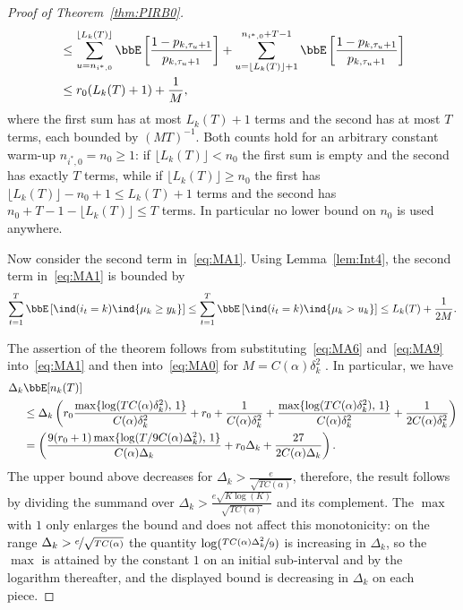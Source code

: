 \documentclass[11pt]{article}
\begin{document}
\begin{proof}[Proof of Theorem~\ref{thm:PIRB0}]
\begin{align}
    \nonumber
    &\leq \sum_{u=n_{i^*,0}}^{\lfloor L_k(T) \rfloor} \bbE \left[   \frac{1-p_{k,\tau_{u}+1}}{p_{k,\tau_{u}+1}}     \right]   + \sum_{u=\lfloor L_k(T) \rfloor + 1}^{n_{i^*,0}+T-1} \bbE \left[   \frac{1-p_{k,\tau_{u}+1}}{p_{k,\tau_{u}+1}}     \right]
    \\
    &\leq  r_0(L_k(T)+1) + \frac{1}{M},
    \label{eq:MA6} 
   \end{align}
   where the first sum has at most $L_k(T)+1$ terms and the second has at most $T$ terms, each bounded by $(MT)^{-1}$. Both counts hold for an arbitrary constant warm-up $n_{i^*,0}=n_0\geq1$: if $\lfloor L_k(T)\rfloor < n_0$ the first sum is empty and the second has exactly $T$ terms, while if $\lfloor L_k(T)\rfloor \geq n_0$ the first has $\lfloor L_k(T)\rfloor-n_0+1 \leq L_k(T)+1$ terms and the second has $n_0+T-1-\lfloor L_k(T)\rfloor \leq T$ terms. In particular no lower bound on $n_0$ is used anywhere. 

Now consider the second term in~\eqref{eq:MA1}. Using Lemma~\ref{lem:Int4}, the second term in~\eqref{eq:MA1} is bounded by
\begin{align}
    \sum_{t=1}^{T}\bbE\left[  \ind(i_t=k )  \ind\{\mu_k \geq y_k  \}   \right]  \leq \sum_{t=1}^{T}\bbE\left[  \ind(i_t=k )  \ind\{\mu_k > u_k  \}   \right]   \leq L_k(T)+\frac{1}{2M}.
    \label{eq:MA9}
\end{align}

The assertion of the theorem follows from substituting~\eqref{eq:MA6} and~\eqref{eq:MA9} into~\eqref{eq:MA1} and then into~\eqref{eq:MA0} for $M=C(\alpha)\delta_k^2$ .
In particular, we have
 \begin{align}
     \nonumber
    \Delta_k  &\bbE[n_k(T)] 
    \\
    \nonumber
    &\leq   \Delta_k  \left(r_0 \frac{\max\{\log(TC(\alpha)\delta_k^2),\,1\}}{C(\alpha)\delta_k^2} + r_0 + \frac{1}{C(\alpha)\delta_k^2} + \frac{\max\{\log(TC(\alpha)\delta_k^2),\,1\}}{C(\alpha)\delta_k^2}  + \frac{1}{2C(\alpha)\delta_k^2} \right)
    \\
    \nonumber
    &=    \left(\frac{9(r_0+1) \max\{\log(T /9 C(\alpha)\Delta_k^2),\,1\}}{C(\alpha)\Delta_k} + r_0 \Delta_k + \frac{27}{2C(\alpha) \Delta_k}  \right).
\end{align}
The upper bound above decreases for  $\Delta_k > \frac{e}{\sqrt{TC(\alpha)}}$, therefore, the result follows by dividing the summand over $\Delta_k > \frac{e\sqrt{K\log(K)}}{\sqrt{TC(\alpha)}}$ and its complement. The $\max$ with $1$ only enlarges the bound and does not affect this monotonicity: on the range $\Delta_k > \nicefrac{e}{\sqrt{TC(\alpha)}}$ the quantity $\log(\nicefrac{T C(\alpha)\Delta_k^2}{9})$ is increasing in $\Delta_k$, so the $\max$ is attained by the constant $1$ on an initial sub-interval and by the logarithm thereafter, and the displayed bound is decreasing in $\Delta_k$ on each piece.
\end{proof}
\end{document}
